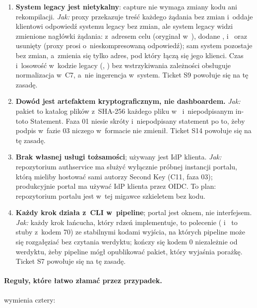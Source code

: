 \begin{enumerate}
  \item \textbf{System legacy jest nietykalny}: capture nie wymaga zmiany kodu ani
        rekompilacji. \emph{Jak:} proxy przekazuje treść każdego żądania bez zmian i~oddaje klientowi odpowiedź systemu legacy bez zmian, ale system legacy widzi zmienione nagłówki żądania:
         z~adresem celu (oryginał w~), dodane ,
         i~ oraz usunięty 
        (proxy prosi o~nieskompresowaną odpowiedź); sam system pozostaje bez zmian, a~zmienia się tylko adres, pod który łączą się jego klienci. Czas i~losowość w~kodzie legacy (, ) bez wstrzykiwania
        zależności obsługuje normalizacja w~C7, a~nie ingerencja w~system. Ticket S9
        powołuje się na tę zasadę.
  \item \textbf{Dowód jest artefaktem kryptograficznym, nie dashboardem.} \emph{Jak:} pakiet
        to katalog plików z~SHA-256 każdego pliku w~ i~niepodpisanym
        in-toto Statement. Faza 01 niesie skróty i~niepodpisany statement po to, żeby podpis
        w~fazie 03 niczego w~formacie nie zmienił. Ticket S14 powołuje się na tę zasadę.
  \item \textbf{Brak własnej usługi tożsamości}; używany jest IdP klienta. \emph{Jak:}
        repozytorium authservice ma służyć wyłącznie próbnej instancji portalu, którą
        mieliby hostować sami autorzy Second Key (C11, faza 03); produkcyjnie portal ma używać IdP klienta przez OIDC.
        To plan: repozytorium portalu jest w~tej migawce szkieletem bez kodu.
  \item \textbf{Każdy krok działa z~CLI w~pipeline}; portal jest oknem, nie interfejsem.
        \emph{Jak:} każdy krok łańcucha, który rdzeń implementuje, to polecenie 
        ( i~ to stuby z~kodem 70) ze stabilnymi kodami
        wyjścia, na których pipeline może się rozgałęziać bez czytania werdyktu;
         kończy się kodem 0 niezależnie od werdyktu, żeby pipeline
        mógł opublikować pakiet, który wyjaśnia porażkę. Ticket S7 powołuje się na tę
        zasadę.
\end{enumerate}

\paragraph{Reguły, które łatwo złamać przez przypadek.}  wymienia cztery:

